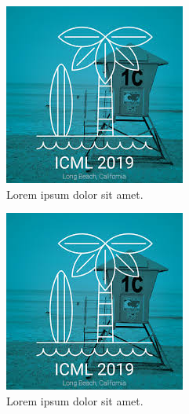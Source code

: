 \documentclass{article}
\begin{document}
\begin{figure}[H]
\vskip 0.2in
\begin{center}
\centerline{\includegraphics[width=0.8\columnwidth]{images/image-example.jpeg}}
\caption{Lorem ipsum dolor sit amet.}
\label{overview}
\end{center}
\vskip -0.2in
\end{figure}




\begin{figure}[H]
\vskip 0.2in
\begin{center}
\centerline{\includegraphics[width=0.8\columnwidth]{images/image-example.jpeg}}
\caption{Lorem ipsum dolor sit amet.}
\label{sample}
\end{center}
\vskip -0.2in
\end{figure}
\end{document}
